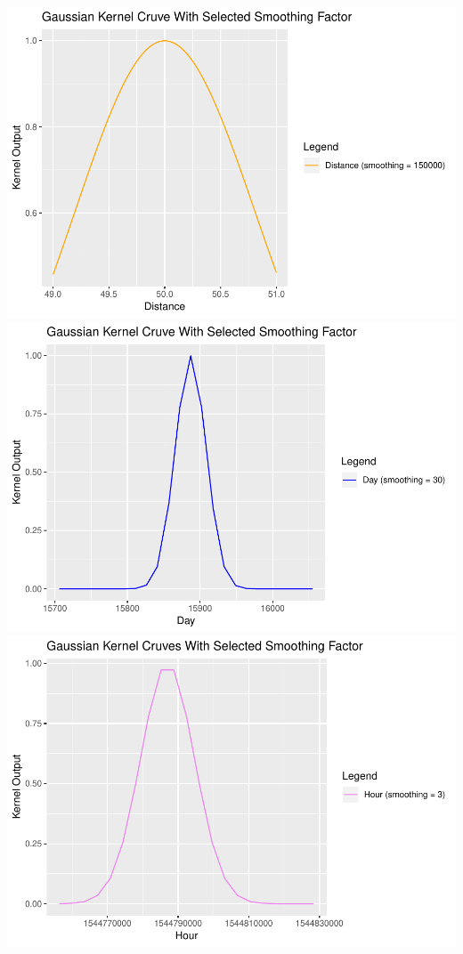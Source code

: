 \documentclass[]{article}
\begin{document}
\includegraphics{lab03_files/figure-latex/unnamed-chunk-4-1.pdf}
\includegraphics{lab03_files/figure-latex/unnamed-chunk-4-2.pdf}
\includegraphics{lab03_files/figure-latex/unnamed-chunk-4-3.pdf}
\end{document}
